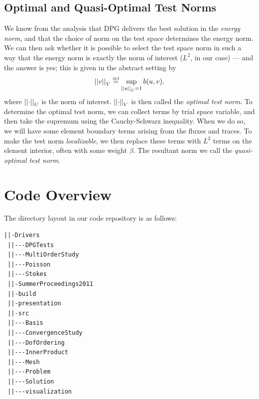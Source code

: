 \subsection{Optimal and Quasi-Optimal Test Norms}
We know from the analysis that DPG delivers the best solution in the \emph{energy norm}, and that the choice of norm on the test space determines the energy norm.  We can then ask whether it is possible to select the test space norm in such a way that the energy norm is exactly the norm of interest ($L^{2}$, in our case) --- and the answer is yes; this is given in the abstract setting by 
\begin{align*}
\NVRnorm{v}_{V}\NVReqdef \sup_{\NVRnorm{u}_{U}=1} b(u,v),
\end{align*}
where $\NVRnorm{\cdot}_{U}$ is the norm of interest.  $\NVRnorm{\cdot}_{V}$ is then called the \emph{optimal test norm}.  To determine the optimal test norm, we can collect terms by trial space variable, and then take the supremum using the Cauchy-Schwarz inequality.  When we do so, we will have some element boundary terms arising from the fluxes and traces.  To make the test norm \emph{localizable}, we then replace these terms with $L^{2}$ terms on the element interior, often with some weight $\beta$.  The resultant norm we call the \emph{quasi-optimal test norm}.

\section{Code Overview}\label{NVR:sec:codeOverview}
The directory layout in our code repository is as follows:
\begin{center}
\begin{minipage}{0.4\textwidth}
{\bf
\begin{lstlisting}[backgroundcolor=\color{lightlightgreen}]
 ||-Drivers
 ||---DPGTests
 ||---MultiOrderStudy
 ||---Poisson
 ||---Stokes
 ||-SummerProceedings2011
 ||-build
 ||-presentation
 ||-src
 ||---Basis
 ||---ConvergenceStudy
 ||---DofOrdering
 ||---InnerProduct
 ||---Mesh
 ||---Problem
 ||---Solution
 ||---visualization
\end{lstlisting}
}
\end{minipage}
\end{center}

